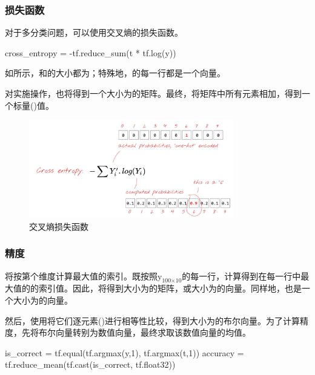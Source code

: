 \begin{content}
\subsubsection{损失函数}

对于多分类问题，可以使用交叉熵的损失函数。

\begin{leftbar}
\begin{python}
cross_entropy = -tf.reduce_sum(t * tf.log(y))
\end{python}
\end{leftbar}

如所示，和的大小都为\code{[100, 10]}；特殊地，的每一行都是一个向量。

对实施操作，也将得到一个大小为\code{[100, 10]}的矩阵。最终，将矩阵中所有元素相加，得到一个标量()值。

\begin{figure}[H]
\centering
\includegraphics[width=0.8\textwidth]{figures/mnist-cross-entropy.png}
\caption{交叉熵损失函数}
 \label{fig:mnist-cross-entropy}
\end{figure}

\subsubsection{精度}

将按第个维度计算最大值的索引。既按照${{\text{y}}_{{\text{100}} \times {\text{10}}}}$的每一行，计算得到在每一行中最大值的的索引值。因此，将得到大小为\code{[100, 1]}的矩阵，或大小为的向量。同样地，也是一个大小为的向量。

然后，使用将它们逐元素()进行相等性比较，得到大小为的布尔向量。为了计算精度，先将布尔向量转别为数值向量，最终求取该数值向量的均值。

\begin{leftbar}
\begin{python}
is_correct = tf.equal(tf.argmax(y,1), tf.argmax(t,1))
accuracy = tf.reduce_mean(tf.cast(is_correct, tf.float32))
\end{python}
\end{leftbar}


\end{content}
